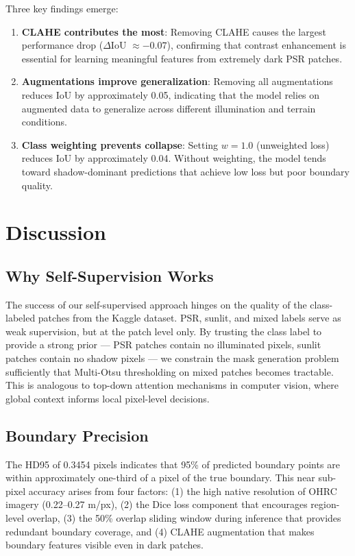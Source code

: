 \documentclass[journal]{IEEEtran}
\begin{document}
Three key findings emerge:
\begin{enumerate}
    \item \textbf{CLAHE contributes the most}: Removing CLAHE causes the largest performance drop ($\Delta$IoU $\approx -0.07$), confirming that contrast enhancement is essential for learning meaningful features from extremely dark PSR patches.
    \item \textbf{Augmentations improve generalization}: Removing all augmentations reduces IoU by approximately 0.05, indicating that the model relies on augmented data to generalize across different illumination and terrain conditions.
    \item \textbf{Class weighting prevents collapse}: Setting $w = 1.0$ (unweighted loss) reduces IoU by approximately 0.04. Without weighting, the model tends toward shadow-dominant predictions that achieve low loss but poor boundary quality.
\end{enumerate}

\section{Discussion}
\label{sec:discussion}

\subsection{Why Self-Supervision Works}

The success of our self-supervised approach hinges on the quality of the class-labeled patches from the Kaggle dataset. PSR, sunlit, and mixed labels serve as weak supervision, but at the patch level only. By trusting the class label to provide a strong prior --- PSR patches contain no illuminated pixels, sunlit patches contain no shadow pixels --- we constrain the mask generation problem sufficiently that Multi-Otsu thresholding on mixed patches becomes tractable. This is analogous to top-down attention mechanisms in computer vision, where global context informs local pixel-level decisions.

\subsection{Boundary Precision}

The HD95 of 0.3454 pixels indicates that 95\% of predicted boundary points are within approximately one-third of a pixel of the true boundary. This near sub-pixel accuracy arises from four factors: (1) the high native resolution of OHRC imagery (0.22--0.27 m/px), (2) the Dice loss component that encourages region-level overlap, (3) the 50\% overlap sliding window during inference that provides redundant boundary coverage, and (4) CLAHE augmentation that makes boundary features visible even in dark patches.
\end{document}
